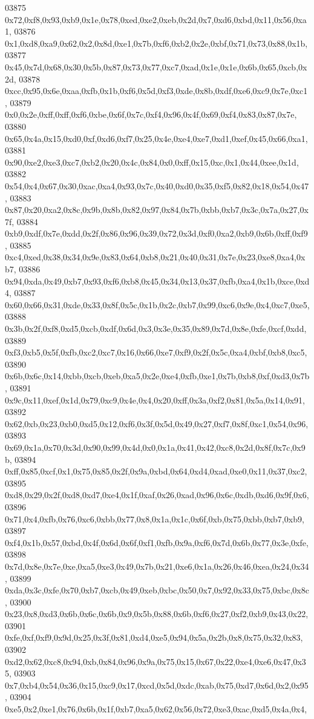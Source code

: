 \begin{DoxyCode}
03875   0x72,0xf8,0x93,0xb9,0x1e,0x78,0xed,0xe2,0xeb,0x2d,0x7,0xd6,0xbd,0x11,0x56,0xa1,
03876   0x1,0xd8,0xa9,0x62,0x2,0x8d,0xe1,0x7b,0xf6,0xb2,0x2e,0xbf,0x71,0x73,0x88,0x1b,
03877   0x45,0x7d,0x68,0x30,0x5b,0x87,0x73,0x77,0xc7,0xad,0x1e,0x1e,0x6b,0x65,0xcb,0x2d,
03878   0xcc,0x95,0x6e,0xaa,0xfb,0x1b,0xf6,0x5d,0xf3,0xde,0x8b,0xdf,0xe6,0xc9,0x7e,0xc1,
03879   0x0,0x2e,0xff,0xff,0xf6,0xbe,0x6f,0x7c,0xf4,0x96,0x4f,0x69,0xf4,0x83,0x87,0x7e,
03880   0x65,0x4a,0x15,0xd0,0xf,0xd6,0xf7,0x25,0x4e,0xe4,0xe7,0xd1,0xef,0x45,0x66,0xa1,
03881   0x90,0xe2,0xe3,0xc7,0xb2,0x20,0x4c,0x84,0x0,0xff,0x15,0xc,0x1,0x44,0xee,0x1d,
03882   0x54,0x4,0x67,0x30,0xac,0xa4,0x93,0x7c,0x40,0xd0,0x35,0xf5,0x82,0x18,0x54,0x47,
03883   0x87,0x20,0xa2,0x8c,0x9b,0x8b,0x82,0x97,0x84,0x7b,0xbb,0xb7,0x3c,0x7a,0x27,0x7f,
03884   0xb9,0xdf,0x7e,0xdd,0x2f,0x86,0x96,0x39,0x72,0x3d,0xf0,0xa2,0xb9,0x6b,0xff,0xf9,
03885   0xc4,0xed,0x38,0x34,0x9e,0x83,0x64,0xb8,0x21,0x40,0x31,0x7e,0x23,0xe8,0xa4,0xb7,
03886   0x94,0xda,0x49,0xb7,0x93,0xf6,0xb8,0x45,0x34,0x13,0x37,0xfb,0xa4,0x1b,0xce,0xd4,
03887   0x60,0x66,0x31,0xde,0x33,0x8f,0x5c,0x1b,0x2c,0xb7,0x99,0xc6,0x9e,0x4,0xc7,0xe5,
03888   0x3b,0x2f,0xf8,0xd5,0xcb,0xdf,0x6d,0x3,0x3e,0x35,0x89,0x7d,0x8e,0xfe,0xcf,0xdd,
03889   0xf3,0xb5,0x5f,0xfb,0xc2,0xc7,0x16,0x66,0xe7,0xf9,0x2f,0x5c,0xa4,0xbf,0xb8,0xc5,
03890   0x6b,0x6c,0x14,0xbb,0xcb,0xeb,0xa5,0x2e,0xe4,0xfb,0xe1,0x7b,0xb8,0xf,0xd3,0x7b,
03891   0x9c,0x11,0xef,0x1d,0x79,0xc9,0x4e,0x4,0x20,0xff,0x3a,0xf2,0x81,0x5a,0x14,0x91,
03892   0x62,0xb,0x23,0xb0,0xd5,0x12,0xf6,0x3f,0x5d,0x49,0x27,0xf7,0x8f,0xc1,0x54,0x96,
03893   0x69,0x1a,0x70,0x3d,0x90,0x99,0x4d,0x0,0x1a,0x41,0x42,0xc8,0x2d,0x8f,0x7c,0x9b,
03894   0xff,0x85,0xcf,0x1,0x75,0x85,0x2f,0x9a,0xbd,0x64,0xd4,0xad,0xe0,0x11,0x37,0xc2,
03895   0xd8,0x29,0x2f,0xd8,0xd7,0xe4,0x1f,0xaf,0x26,0xad,0x96,0x6c,0xdb,0xd6,0x9f,0x6,
03896   0x71,0x4,0xfb,0x76,0xc6,0xbb,0x77,0x8,0x1a,0x1c,0x6f,0xb,0x75,0xbb,0xb7,0xb9,
03897   0xf4,0x1b,0x57,0xbd,0x4f,0x6d,0x6f,0xf1,0xfb,0x9a,0xf6,0x7d,0x6b,0x77,0x3e,0xfe,
03898   0x7d,0x8e,0x7e,0xe,0xa5,0xe3,0x49,0x7b,0x21,0xe6,0x1a,0x26,0x46,0xea,0x24,0x34,
03899   0xda,0x3c,0xfe,0x70,0xb7,0xcb,0x49,0xeb,0xbc,0x50,0x7,0x92,0x33,0x75,0xbc,0x8c,
03900   0x23,0x8,0xd3,0x6b,0x6c,0x6b,0x9,0x5b,0x88,0x6b,0xf6,0x27,0xf2,0xb9,0x43,0x22,
03901   0xfe,0xf,0xf9,0x9d,0x25,0x3f,0x81,0xd4,0xe5,0x94,0x5a,0x2b,0x8,0x75,0x32,0x83,
03902   0xd2,0x62,0xc8,0x94,0xb,0x84,0x96,0x9a,0x75,0x15,0x67,0x22,0xe4,0xe6,0x47,0x35,
03903   0x7,0xb4,0x54,0x36,0x15,0xc9,0x17,0xcd,0x5d,0xdc,0xab,0x75,0xd7,0x6d,0x2,0x95,
03904   0xe5,0x2,0xe1,0x76,0x6b,0x1f,0xb7,0xa5,0x62,0x56,0x72,0xe3,0xac,0xd5,0x4a,0x4,

\end{DoxyCode}
